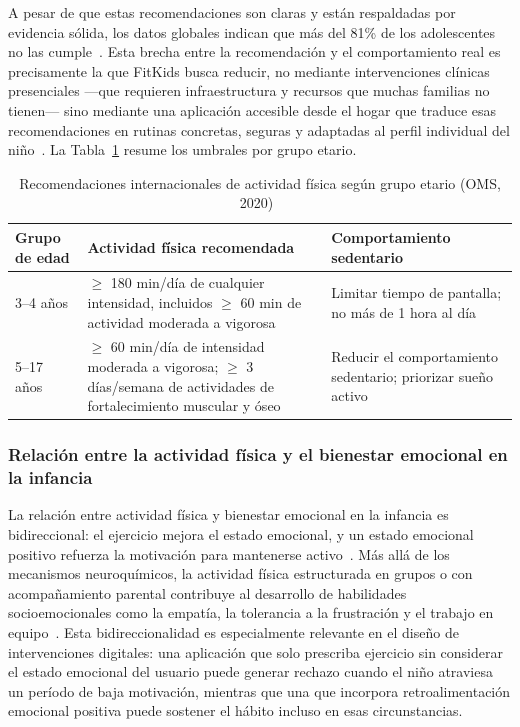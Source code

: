 					A pesar de que estas recomendaciones son claras y están respaldadas por evidencia sólida, los datos globales indican que más del 81\% de los adolescentes no las cumple~\cite{Guthold2020}. Esta brecha entre la recomendación y el comportamiento real es precisamente la que FitKids busca reducir, no mediante intervenciones clínicas presenciales ---que requieren infraestructura y recursos que muchas familias no tienen--- sino mediante una aplicación accesible desde el hogar que traduce esas recomendaciones en rutinas concretas, seguras y adaptadas al perfil individual del niño~\cite{Direito2017,UN2015}. La Tabla~\ref{tab:recomendaciones_oms} resume los umbrales por grupo etario.
					
					\begin{table}[H]
						\centering
						\caption[Recomendaciones internacionales de actividad física]{Recomendaciones internacionales de actividad física según grupo etario (OMS, 2020)~\cite{Bull2020}}
						\label{tab:recomendaciones_oms}
						\begin{tabular}{p{2.8cm}p{6.0cm}p{6.0cm}}
							\hline
							\textbf{Grupo de edad} & \textbf{Actividad física recomendada} & \textbf{Comportamiento sedentario} \\
							\hline
							3--4 años & $\geq$ 180 min/día de cualquier intensidad, incluidos $\geq$ 60 min de actividad moderada a vigorosa & Limitar tiempo de pantalla; no más de 1 hora al día \\
							
							5--17 años & $\geq$ 60 min/día de intensidad moderada a vigorosa; $\geq$ 3 días/semana de actividades de fortalecimiento muscular y óseo & Reducir el comportamiento sedentario; priorizar sueño activo \\
							\hline
						\end{tabular}
					\end{table}
					\tblnote
					
				\subsubsection{Relación entre la actividad física y el bienestar emocional en la infancia}
					La relación entre actividad física y bienestar emocional en la infancia es bidireccional: el ejercicio mejora el estado emocional, y un estado emocional positivo refuerza la motivación para mantenerse activo~\cite{Wilhite2023}. Más allá de los mecanismos neuroquímicos, la actividad física estructurada en grupos o con acompañamiento parental contribuye al desarrollo de habilidades socioemocionales como la empatía, la tolerancia a la frustración y el trabajo en equipo~\cite{VegaDiaz2023}. Esta bidireccionalidad es especialmente relevante en el diseño de intervenciones digitales: una aplicación que solo prescriba ejercicio sin considerar el estado emocional del usuario puede generar rechazo cuando el niño atraviesa un período de baja motivación, mientras que una que incorpora retroalimentación emocional positiva puede sostener el hábito incluso en esas circunstancias.
					
